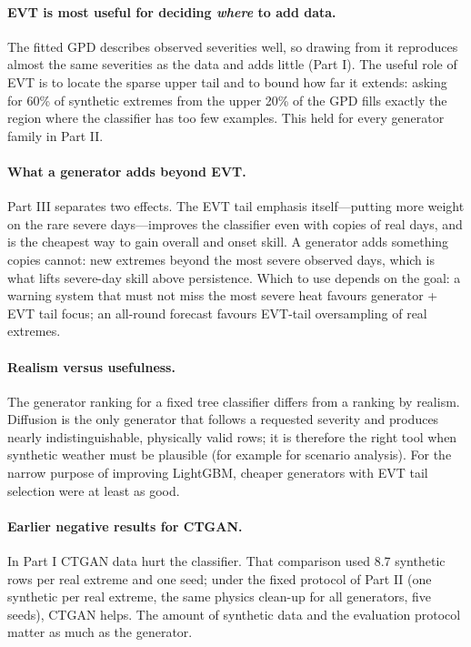 \documentclass[11pt,a4paper]{article}
\begin{document}
\paragraph{EVT is most useful for deciding \emph{where} to add data.} The fitted GPD describes observed
severities well, so drawing from it reproduces almost the same severities as the data and adds little (Part I).
The useful role of EVT is to locate the sparse upper tail and to bound how far it extends: asking for 60\% of
synthetic extremes from the upper 20\% of the GPD fills exactly the region where the classifier has too few
examples. This held for every generator family in Part II.

\paragraph{What a generator adds beyond EVT.} Part III separates two effects. The EVT tail emphasis itself---putting
more weight on the rare severe days---improves the classifier even with copies of real days, and is the cheapest
way to gain overall and onset skill. A generator adds something copies cannot: new extremes beyond the most severe
observed days, which is what lifts severe-day skill above persistence. Which to use depends on the goal: a warning
system that must not miss the most severe heat favours generator + EVT tail focus; an all-round forecast favours
EVT-tail oversampling of real extremes.

\paragraph{Realism versus usefulness.} The generator ranking for a fixed tree classifier differs from a ranking by
realism. Diffusion is the only generator that follows a requested severity and produces nearly
indistinguishable, physically valid rows; it is therefore the right tool when synthetic weather must be
plausible (for example for scenario analysis). For the narrow purpose of improving LightGBM, cheaper generators
with EVT tail selection were at least as good.

\paragraph{Earlier negative results for CTGAN.} In Part I CTGAN data hurt the classifier. That comparison used
8.7 synthetic rows per real extreme and one seed; under the fixed protocol of Part II (one synthetic per real
extreme, the same physics clean-up for all generators, five seeds), CTGAN helps. The amount of synthetic data
and the evaluation protocol matter as much as the generator.
\end{document}

